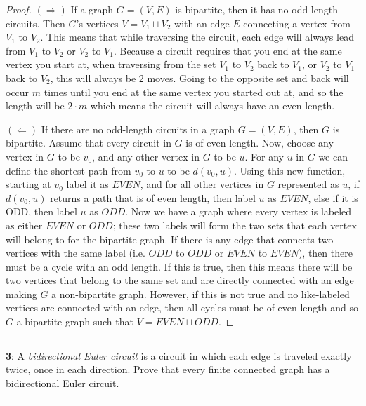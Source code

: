 \documentclass[11pt]{article}
\newcommand\question[2]{\vspace{.25in}\hrule\textbf{#1}: #2\vspace{.5em}\hrule\vspace{.10in}}
\begin{document}
\begin{proof}
	$(\Longrightarrow)$ If a graph $G=(V,E)$ is bipartite, then it has no odd-length circuits. Then $G$'s vertices $V=V_1 \sqcup V_2$ with an edge $E$ connecting a vertex from $V_1$ to $V_2$. This means that while traversing the circuit, each edge will always lead from $V_1$ to $V_2$ or $V_2$ to $V_1$. Because a circuit requires that you end at the same vertex you start at, when traversing from the set $V_1$ to $V_2$ back to $V_1$, or $V_2$ to $V_1$ back to $V_2$, this will always be 2 moves. Going to the opposite set and back will occur $m$ times until you end at the same vertex you started out at, and so the length will be $2\cdot m$ which means the circuit will always have an even length.

	$(\Longleftarrow)$ If there are no odd-length circuits in a graph $G=(V,E)$, then $G$ is bipartite. Assume that every circuit in $G$ is of even-length. Now, choose any vertex in $G$ to be $v_0$, and any other vertex in $G$ to be $u$. For any $u$ in $G$ we can define the shortest path from $v_0$ to $u$ to be $d(v_0,u)$. Using this new function, starting at $v_0$ label it as $EVEN$, and for all other vertices in $G$ represented as $u$, if $d(v_0, u)$ returns a path that is of even length, then label $u$ as $EVEN$, else if it is ODD, then label $u$ as $ODD$. Now we have a graph where every vertex is labeled as either $EVEN$ or $ODD$; these two labels will form the two sets that each vertex will belong to for the bipartite graph. If there is any edge that connects two vertices with the same label (i.e. $ODD$ to $ODD$ or $EVEN$ to $EVEN$), then there must be a cycle with an odd length. If this is true, then this means there will be two vertices that belong to the same set and are directly connected with an edge making $G$ a non-bipartite graph. However, if this is not true and no like-labeled vertices are connected with an edge, then all cycles must be of even-length and so $G$ a bipartite graph such that $V=EVEN \sqcup ODD$.
\end{proof}

\newpage

\question{3}{A \textit{bidirectional Euler circuit} is a circuit in which each edge is traveled exactly twice, once in each direction. Prove that every finite connected graph has a bidirectional Euler circuit.}
\end{document}
